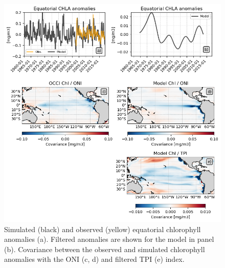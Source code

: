 \begin{figure}
	\centering
	\includegraphics[scale=0.4]{figs/fig2.png}
	\caption{Simulated (black) and observed (yellow) equatorial chlorophyll anomalies (a). Filtered anomalies are shown for the model in panel (b). Covariance between the observed and simulated chlorophyll anomalies with the ONI (c, d) and filtered TPI (e) index.  }
	\label{fig:nemo-sat-chl}
\end{figure}
